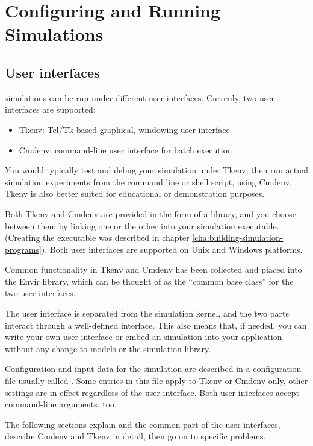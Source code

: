 \chapter{Configuring and Running Simulations}
\label{cha:run-sim}

\section{User interfaces}

{\opp} simulations can be run under different user interfaces.
Currenly, two user interfaces are supported:

\begin{itemize}
  \item Tkenv: Tcl/Tk-based graphical, windowing user interface
  \item Cmdenv: command-line user interface for batch execution
\end{itemize}


You would typically test and debug your simulation under Tkenv,
then run actual simulation experiments from the command line or
shell script, using Cmdenv. Tkenv is also better suited for educational or
demonstration purposes.

Both Tkenv and Cmdenv are provided in the form of a library, and
you choose between them by linking one or the other into your
simulation executable. (Creating the executable was described in
chapter \ref{cha:building-simulation-programs}). Both user interfaces
are supported on Unix and Windows platforms.

Common functionality in Tkenv and Cmdenv has been collected and
placed into the Envir library, which can be thought of as the
``common base class'' for the two user interfaces.

The user interface is separated from the
simulation kernel, and the two parts interact through a well-defined
interface. This also means that, if needed, you can write your
own user interface or embed an {\opp} simulation into your application
without any change to models or the simulation library.

Configuration and input data for the simulation are described in
a configuration file usually called .
Some entries in this file apply to Tkenv or Cmdenv only, other
settings are in effect regardless of the user interface.
Both user interfaces accept command-line arguments, too.


The following sections explain  and the common part of
the user interfaces, describe Cmdenv and Tkenv in detail, then
go on to specific problems.


